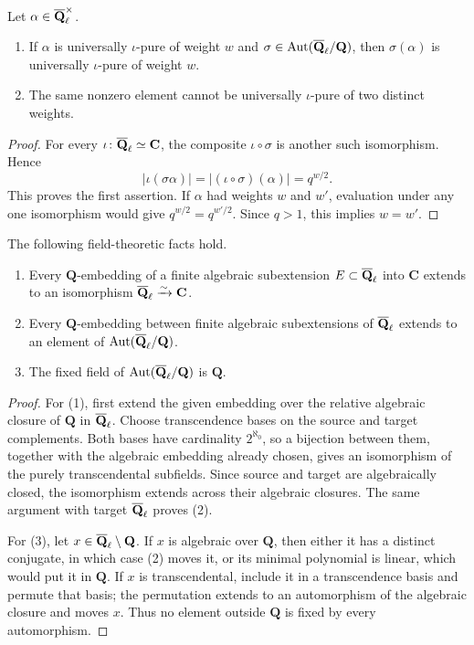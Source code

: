 \begin{lemma}
\label{lem:universal-weight-invariance}
Let \(\alpha\in\overline{\mathbf Q}_\ell^\times\).
\begin{enumerate}
\item If \(\alpha\) is universally \(\iota\)-pure of weight \(w\) and
      \(\sigma\in\operatorname{Aut}(\overline{\mathbf Q}_\ell/\mathbf Q)\), then
      \(\sigma(\alpha)\) is universally \(\iota\)-pure of weight \(w\).
\item The same nonzero element cannot be universally
      \(\iota\)-pure of two distinct weights.
\end{enumerate}
\end{lemma}

\begin{proof}
For every \(\iota\colon\overline{\mathbf Q}_\ell\simeq\mathbf C\), the composite
\(\iota\circ\sigma\) is another such isomorphism.  Hence
\[
 |\iota(\sigma\alpha)|
 =|(\iota\circ\sigma)(\alpha)|=q^{w/2}.
\]
This proves the first assertion.  If \(\alpha\) had weights \(w\) and
\(w'\), evaluation under any one isomorphism would give
\(q^{w/2}=q^{w'/2}\).  Since \(q>1\), this implies \(w=w'\).
\end{proof}

\begin{lemma}
\label{lem:qbarl-automorphism-fixed-field}
The following field-theoretic facts hold.
\begin{enumerate}
\item Every \(\mathbf Q\)-embedding of a finite algebraic subextension
      \(E\subset\overline{\mathbf Q}_\ell\) into \(\mathbf C\) extends to an isomorphism
      \(\overline{\mathbf Q}_\ell\xrightarrow{\sim}\mathbf C\).
\item Every \(\mathbf Q\)-embedding between finite algebraic
      subextensions of \(\overline{\mathbf Q}_\ell\) extends to an element of
      \(\operatorname{Aut}(\overline{\mathbf Q}_\ell/\mathbf Q)\).
\item The fixed field of
      \(\operatorname{Aut}(\overline{\mathbf Q}_\ell/\mathbf Q)\) is \(\mathbf Q\).
\end{enumerate}
\end{lemma}

\begin{proof}
For (1), first extend the given embedding over the relative algebraic
closure of \(\mathbf Q\) in \(\overline{\mathbf Q}_\ell\).  Choose transcendence bases on
the source and target complements.  Both bases have cardinality
\(2^{\aleph_0}\), so a bijection between them, together with the
algebraic embedding already chosen, gives an isomorphism of the purely
transcendental subfields.  Since source and target are algebraically
closed, the isomorphism extends across their algebraic closures.  The
same argument with target \(\overline{\mathbf Q}_\ell\) proves (2).

For (3), let \(x\in\overline{\mathbf Q}_\ell\setminus\mathbf Q\).  If \(x\) is algebraic
over \(\mathbf Q\), then either it has a distinct conjugate, in which case
(2) moves it, or its minimal polynomial is linear, which would put it in
\(\mathbf Q\).  If \(x\) is transcendental, include it in a
transcendence basis and permute that basis; the permutation extends to an
automorphism of the algebraic closure and moves \(x\).  Thus no element
outside \(\mathbf Q\) is fixed by every automorphism.
\end{proof}

